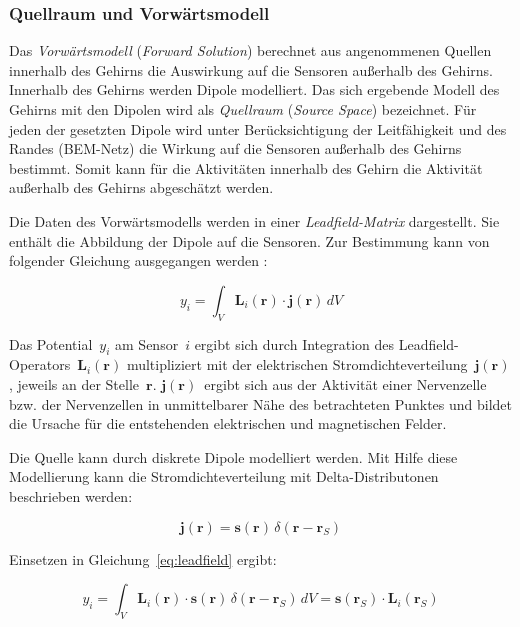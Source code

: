 \documentclass[doc,a4paper,12pt]{apa6}
\newcommand{\mx}[1]{\mathbf{#1}}
\begin{document}
\subsubsection{Quellraum und Vorwärtsmodell}
\label{sec:lead}

Das \emph{Vorwärtsmodell} (\emph{Forward Solution}) berechnet aus angenommenen Quellen innerhalb des Gehirns die Auswirkung auf die Sensoren außerhalb des Gehirns. Innerhalb des Gehirns werden Dipole modelliert. Das sich ergebende Modell des Gehirns mit den Dipolen wird als \emph{Quellraum} (\emph{Source Space}) bezeichnet. Für jeden der gesetzten Dipole wird unter Berücksichtigung der Leitfähigkeit und des Randes (BEM-Netz) die Wirkung auf die Sensoren außerhalb des Gehirns bestimmt. Somit kann für die Aktivitäten innerhalb des Gehirn die Aktivität außerhalb des Gehirns abgeschätzt werden.

Die Daten des Vorwärtsmodells werden in einer \emph{Leadfield-Matrix} dargestellt. Sie enthält die Abbildung der Dipole auf die Sensoren. Zur Bestimmung kann von folgender Gleichung ausgegangen werden \parencite{maurits2011neurology}:

\begin{equation}
y_i = \int_V \mx{L}_i (\mx{r}) \cdot \mx{j} (\mx{r})\, dV
\label{eq:leadfield}
\end{equation}

Das Potential~$y_i$ am Sensor~$i$ ergibt sich durch Integration des Leadfield-Operators~$\mx{L}_i(\mx{r})$ multipliziert mit der elektrischen Stromdichteverteilung~$\mx{j}(\mx{r})$, jeweils an der Stelle~$\mx{r}$. $\mx{j}(\mx{r})$~ergibt sich aus der Aktivität einer Nervenzelle bzw. der Nervenzellen in unmittelbarer Nähe des betrachteten Punktes und bildet die Ursache für die entstehenden elektrischen und magnetischen Felder.

Die Quelle kann durch diskrete Dipole modelliert werden. Mit Hilfe diese Modellierung kann die Stromdichteverteilung mit Delta-Distributonen beschrieben werden:

\begin{equation}
\mx{j} (\mx{r}) = \mx{s}(\mx{r})\,\delta(\mx{r}-\mx{r}_S)
\end{equation}

Einsetzen in Gleichung~\ref{eq:leadfield} ergibt:

\begin{equation}
y_i = \int_V \mx{L}_i (\mx{r}) \cdot \mx{s}(\mx{r})\,\delta(\mx{r}-\mx{r}_S)\, dV = \mx{s}(\mx{r}_S) \cdot \mx{L}_i(\mx{r}_S)
\label{eq:leadfield2}
\end{equation}
\end{document}
